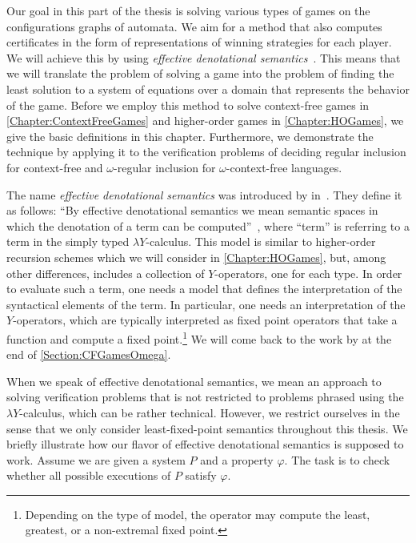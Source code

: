\documentclass[../../diss.tex]{subfiles}
\begin{document}
Our goal in this part of the thesis is solving various types of games on the configurations graphs of automata.
We aim for a method that also computes certificates in the form of representations of winning strategies for each player.
We will achieve this by using \emph{effective denotational semantics}~\cite{Aehlig07,Summers77,SalvatiW15}.
This means that we will translate the problem of solving a game into the problem of finding the least solution to a system of equations over a domain that represents the behavior of the game.
Before we employ this method to solve context-free games in \cref{Chapter:ContextFreeGames} and higher-order games in \cref{Chapter:HOGames}, we give the basic definitions in this chapter.
Furthermore, we demonstrate the technique by applying it to the verification problems of deciding regular inclusion for context-free and $\omega$-regular inclusion for $\omega$-context-free languages.

The name \emph{effective denotational semantics} was introduced by \citeauthor{SalvatiW15} in~\cite{SalvatiW15}.
They define it as follows: \enquote{By effective denotational semantics we mean semantic spaces in which the denotation of a term can be computed}~\cite{SalvatiW15}, where \enquote{term} is referring to a term in the simply typed $\lambda Y$-calculus.
This model is similar to higher-order recursion schemes which we will consider in \cref{Chapter:HOGames}, but, among other differences, includes a collection of $Y$-operators, one for each type.
In order to evaluate such a term, one needs a model that defines the interpretation of the syntactical elements of the term.
In particular, one needs an interpretation of the $Y$-operators, which are typically interpreted as fixed point operators that take a function and compute a fixed point.\footnote{Depending on the type of model, the operator may compute the least, greatest, or a non-extremal fixed point.}
We will come back to the work by \citeauthor{SalvatiW15} at the end of \cref{Section:CFGamesOmega}.

When we speak of effective denotational semantics, we mean an approach to solving verification problems that is not restricted to problems phrased using the $\lambda Y$-calculus, which can be rather technical.
However, we restrict ourselves in the sense that we only consider least-fixed-point semantics throughout this thesis.
We briefly illustrate how our flavor of effective denotational semantics is supposed to work.
Assume we are given a system $P$ and a property $\varphi$.
The task is to check whether all possible executions of $P$ satisfy $\varphi$.
\end{document}
